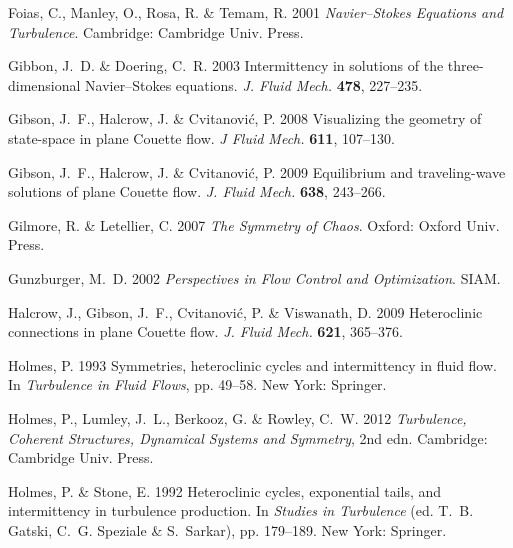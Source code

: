 \documentclass{jfm}
\begin{document}
\begin{thebibliography}{68}
{\sc Foias, C., Manley, O., Rosa, R. \& Temam, R.} 2001 {\em {Navier--Stokes}
  Equations and Turbulence\/}. Cambridge: Cambridge Univ. Press.

{\sc Gibbon, J.~D. \& Doering, C.~R.} 2003 Intermittency in solutions of the
  three-dimensional {N}avier--{S}tokes equations. {\em J. Fluid Mech.\/} {\bf
  478}, 227--235.

{\sc Gibson, J.~F., Halcrow, J. \& Cvitanovi{\'c}, P.} 2008 Visualizing the
  geometry of state-space in plane {Couette} flow. {\em J Fluid Mech.\/} {\bf
  611}, 107--130.

{\sc Gibson, J.~F., Halcrow, J. \& Cvitanovi{\'c}, P.} 2009 Equilibrium and
  traveling-wave solutions of plane {Couette} flow. {\em J. Fluid Mech.\/} {\bf
  638}, 243--266.

{\sc Gilmore, R. \& Letellier, C.} 2007 {\em The Symmetry of Chaos\/}. Oxford:
  Oxford Univ. Press.

{\sc Gunzburger, M.~D.} 2002 {\em Perspectives in Flow Control and
  Optimization\/}. SIAM.

{\sc Halcrow, J., Gibson, J.~F., Cvitanovi{\'c}, P. \& Viswanath, D.} 2009
  Heteroclinic connections in plane {C}ouette flow. {\em J. Fluid Mech.\/} {\bf
  621}, 365--376.

{\sc Holmes, P.} 1993 Symmetries, heteroclinic cycles and intermittency in
  fluid flow. In {\em Turbulence in Fluid Flows\/}, pp. 49--58. New York:
  Springer.

{\sc Holmes, P., Lumley, J.~L., Berkooz, G. \& Rowley, C.~W.} 2012 {\em
  Turbulence, Coherent Structures, Dynamical Systems and Symmetry\/}, 2nd edn.
  Cambridge: Cambridge Univ. Press.

{\sc Holmes, P. \& Stone, E.} 1992 Heteroclinic cycles, exponential tails, and
  intermittency in turbulence production. In {\em Studies in Turbulence\/} (ed.
  T.~B. Gatski, C.~G. Speziale \& S.~Sarkar), pp. 179--189. New York: Springer.


\end{thebibliography}
\end{document}
